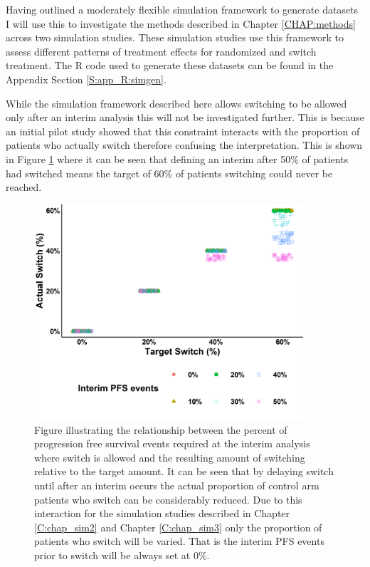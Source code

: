 Having outlined a moderately flexible simulation framework to generate datasets I will use this to investigate the methods described in Chapter \ref{CHAP:methods} across two simulation studies. These simulation studies use this framework to assess different patterns of treatment effects for randomized and switch treatment. The R code \citep{Rsoftware} used to generate these datasets can be found in the Appendix Section \ref{S:app_R:simgen}.

While the simulation framework described here allows switching to be allowed only after an interim analysis this will not be investigated further. This is because an initial pilot study showed that this constraint interacts with the proportion of patients who actually switch therefore confusing the interpretation. This is shown in Figure \ref{F:chap_sim_design:pswitch} where it can be seen that defining an interim after 50\% of patients had switched means the target of 60\% of patients switching could never be reached.

\begin{figure}[ht]
\centering
\includegraphics[width=10cm]{images/chap_simdesign/p_switch.png}
\caption{\label{F:chap_sim_design:pswitch} Figure illustrating the relationship between the percent of progression free survival events required at the interim analysis where switch is allowed and the resulting amount of switching relative to the target amount. It can be seen that by delaying switch until after an interim occurs the actual proportion of control arm patients who switch can be considerably reduced. Due to this interaction for the simulation studies described in Chapter \ref{C:chap_sim2} and Chapter \ref{C:chap_sim3} only the proportion of patients who switch will be varied. That is the interim PFS events prior to switch will be always set at 0\%.}
\end{figure}






